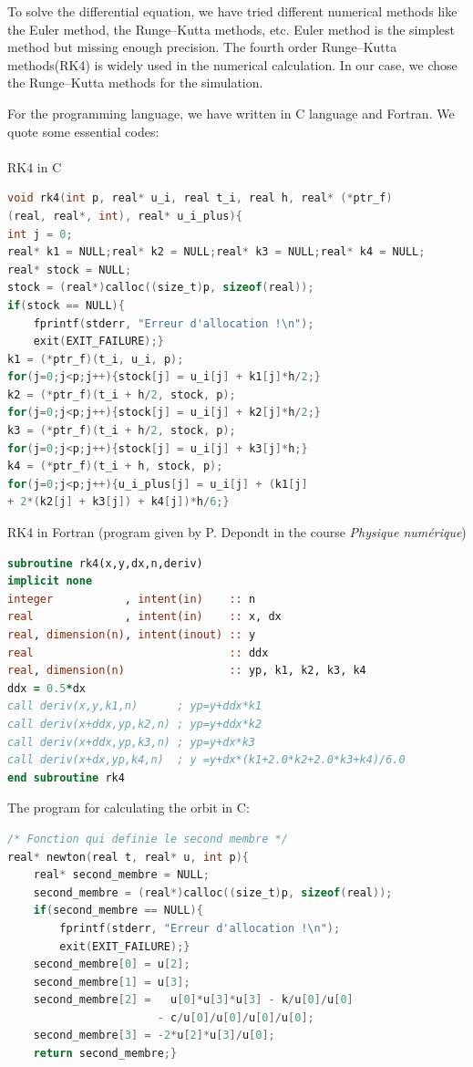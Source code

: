 To solve the differential equation, we have tried different numerical methods like the
Euler method, the Runge–Kutta methods, etc. Euler method is the simplest method but
missing enough precision. The fourth order Runge–Kutta methods(RK4) is widely used in the
numerical calculation. In our case, we chose the Runge–Kutta methods for the
simulation.

For the programming language, we have written in C language and Fortran. We quote some
essential codes:
\\
\\
RK4 in C
\begin{lstlisting}[language=C,basicstyle=\small\ttfamily]
void rk4(int p, real* u_i, real t_i, real h, real* (*ptr_f)
(real, real*, int), real* u_i_plus){
int j = 0;
real* k1 = NULL;real* k2 = NULL;real* k3 = NULL;real* k4 = NULL;
real* stock = NULL;
stock = (real*)calloc((size_t)p, sizeof(real));
if(stock == NULL){
	fprintf(stderr, "Erreur d'allocation !\n");
	exit(EXIT_FAILURE);}
k1 = (*ptr_f)(t_i, u_i, p);
for(j=0;j<p;j++){stock[j] = u_i[j] + k1[j]*h/2;}
k2 = (*ptr_f)(t_i + h/2, stock, p);
for(j=0;j<p;j++){stock[j] = u_i[j] + k2[j]*h/2;}
k3 = (*ptr_f)(t_i + h/2, stock, p);
for(j=0;j<p;j++){stock[j] = u_i[j] + k3[j]*h;}
k4 = (*ptr_f)(t_i + h, stock, p);
for(j=0;j<p;j++){u_i_plus[j] = u_i[j] + (k1[j] 
+ 2*(k2[j] + k3[j]) + k4[j])*h/6;}
\end{lstlisting}
RK4 in Fortran (program given by P. Depondt in the course \textit{Physique numérique})
\begin{lstlisting}[language=Fortran,basicstyle=\small\ttfamily]
subroutine rk4(x,y,dx,n,deriv)
implicit none
integer           , intent(in)    :: n
real              , intent(in)    :: x, dx
real, dimension(n), intent(inout) :: y
real                              :: ddx
real, dimension(n)                :: yp, k1, k2, k3, k4
ddx = 0.5*dx
call deriv(x,y,k1,n)      ; yp=y+ddx*k1
call deriv(x+ddx,yp,k2,n) ; yp=y+ddx*k2
call deriv(x+ddx,yp,k3,n) ; yp=y+dx*k3
call deriv(x+dx,yp,k4,n)  ; y =y+dx*(k1+2.0*k2+2.0*k3+k4)/6.0
end subroutine rk4
\end{lstlisting} 

The program for calculating the orbit in C:
\begin{lstlisting}[language=C,basicstyle=\small\ttfamily]
/* Fonction qui definie le second membre */
real* newton(real t, real* u, int p){
	real* second_membre = NULL;
	second_membre = (real*)calloc((size_t)p, sizeof(real));
	if(second_membre == NULL){
		fprintf(stderr, "Erreur d'allocation !\n");
		exit(EXIT_FAILURE);}
	second_membre[0] = u[2];
	second_membre[1] = u[3];
	second_membre[2] =   u[0]*u[3]*u[3] - k/u[0]/u[0]
	                   - c/u[0]/u[0]/u[0]/u[0];
	second_membre[3] = -2*u[2]*u[3]/u[0];
	return second_membre;}
\end{lstlisting}

